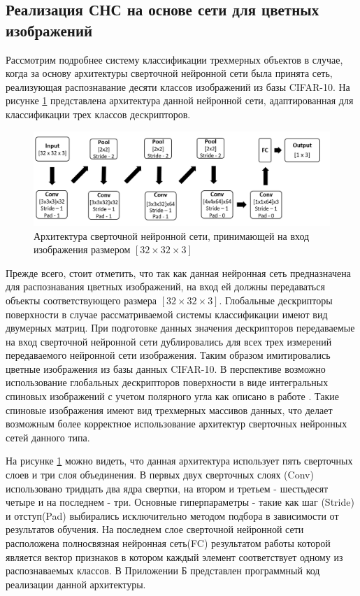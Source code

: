 \documentclass[14pt]{article}
\numberwithin{figure}{section}
\numberwithin{equation}{section}
\begin{document}
 \subsection{Реализация СНС на основе сети для цветных изображений}\label{ssec4.2}

Рассмотрим подробнее систему классификации трехмерных объектов в случае, когда за основу архитектуры сверточной нейронной сети была принята сеть, реализующая распознавание десяти классов изображений из базы CIFAR-10. На рисунке \ref{ris:9} представлена архитектура данной нейронной сети, адаптированная для классификации трех классов дескрипторов.

\begin{figure}[h]
   \begin{center}
       \includegraphics[scale=0.7] {9.JPG}
       \caption{Архитектура сверточной нейронной сети, принимающей на вход изображения размером $[32 \times 32 \times 3]$}
       \label{ris:9}
   \end{center}
\end{figure}

Прежде всего, стоит отметить, что так как данная нейронная сеть предназначена для распознавания цветных изображений, на вход ей должны передаваться объекты соответствующего размера $[32 \times 32 \times 3]$. Глобальные дескрипторы поверхности в случае рассматриваемой системы классификации имеют вид двумерных матриц. При подготовке данных значения дескрипторов передаваемые на вход сверточной нейронной сети дублировались для всех трех измерений передаваемого нейронной сети изображения. Таким образом имитировались цветные изображения из базы данных CIFAR-10. В перспективе возможно использование глобальных дескрипторов поверхности в виде интегральных спиновых изображений с учетом полярного угла как описано в работе \cite{Chernikoff}. Такие спиновые изображения имеют вид трехмерных массивов данных, что делает возможным более корректное использование архитектур сверточных нейронных сетей данного типа.

На рисунке \ref{ris:9} можно видеть, что данная архитектура использует пять сверточных слоев и три слоя объединения. В первых двух сверточных слоях (Conv) использовано тридцать два ядра свертки, на втором и третьем - шестьдесят четыре и на последнем - три. Основные гиперпараметры - такие как шаг (Stride) и отступ(Pad) выбирались исключительно методом подбора в зависимости от результатов обучения. На последнем слое сверточной нейронной сети расположена полносвязная нейронная сеть(FC) результатом работы которой является вектор признаков в котором каждый элемент соответствует одному из распознаваемых классов. В Приложении Б представлен программный код реализации данной архитектуры.
\end{document}
